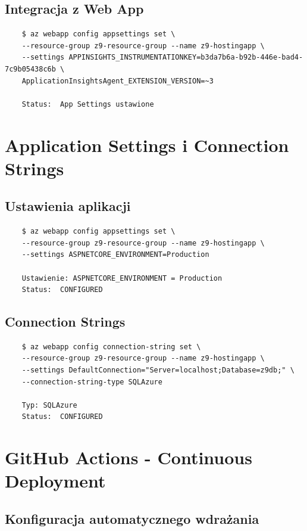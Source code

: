 \documentclass[twoside]{article}
\begin{document}
\subsection{Integracja z Web App}

\begin{verbatim}
	$ az webapp config appsettings set \
	--resource-group z9-resource-group --name z9-hostingapp \
	--settings APPINSIGHTS_INSTRUMENTATIONKEY=b3da7b6a-b92b-446e-bad4-7c9b05438c6b \
	ApplicationInsightsAgent_EXTENSION_VERSION=~3
	
	Status:  App Settings ustawione
\end{verbatim}

\section{Application Settings i Connection Strings}

\subsection{Ustawienia aplikacji}

\begin{verbatim}
	$ az webapp config appsettings set \
	--resource-group z9-resource-group --name z9-hostingapp \
	--settings ASPNETCORE_ENVIRONMENT=Production
	
	Ustawienie: ASPNETCORE_ENVIRONMENT = Production
	Status:  CONFIGURED
\end{verbatim}

\subsection{Connection Strings}

\begin{verbatim}
	$ az webapp config connection-string set \
	--resource-group z9-resource-group --name z9-hostingapp \
	--settings DefaultConnection="Server=localhost;Database=z9db;" \
	--connection-string-type SQLAzure
	
	Typ: SQLAzure
	Status:  CONFIGURED
\end{verbatim}

\section{GitHub Actions - Continuous Deployment}

\subsection{Konfiguracja automatycznego wdrażania}
\end{document}
